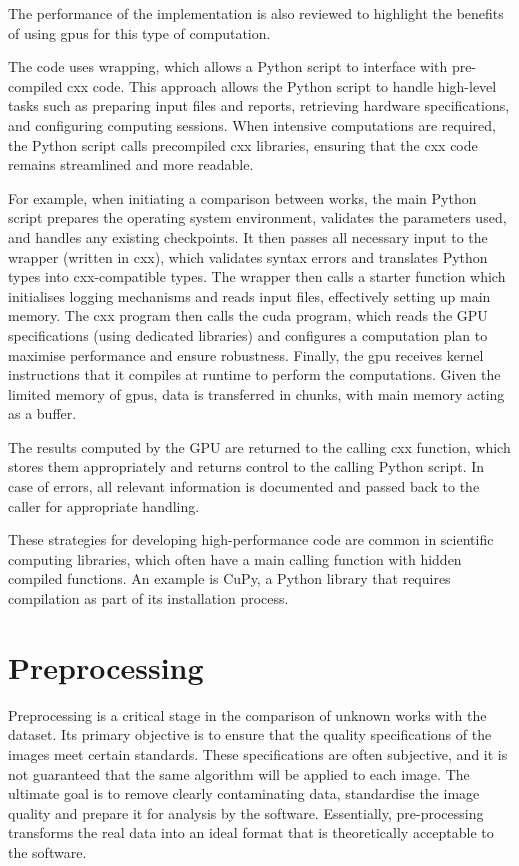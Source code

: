 \begin{toReview}
	\noindent The performance of the implementation is also reviewed to highlight the benefits of using \gls{gpu}s for this type of computation.

	\bigskip\noindent The code uses wrapping, which allows a \gls{Python} script to interface with pre-compiled \gls{cxx} code. This approach allows the \gls{Python} script to handle high-level tasks such as preparing input files and reports, retrieving hardware specifications, and configuring computing sessions. When intensive computations are required, the \gls{Python} script calls precompiled \gls{cxx} libraries, ensuring that the \gls{cxx} code remains streamlined and more readable.

	\noindent For example, when initiating a comparison between works, the main \gls{Python} script prepares the operating system environment, validates the parameters used, and handles any existing checkpoints. It then passes all necessary input to the wrapper (written in \gls{cxx}), which validates syntax errors and translates Python types into \gls{cxx}-compatible types. The wrapper then calls a starter function which initialises logging mechanisms and reads input files, effectively setting up main memory. The \gls{cxx} program then calls the \gls{cuda} program, which reads the GPU specifications (using dedicated libraries) and configures a computation plan to maximise performance and ensure robustness. Finally, the \gls{gpu} receives kernel instructions that it compiles at runtime to perform the computations. Given the limited memory of \gls{gpu}s, data is transferred in chunks, with main memory acting as a buffer.

	\noindent The results computed by the GPU are returned to the calling \gls{cxx} function, which stores them appropriately and returns control to the calling \gls{Python} script. In case of errors, all relevant information is documented and passed back to the caller for appropriate handling.

	\noindent These strategies for developing high-performance code are common in scientific computing libraries, which often have a main calling function with hidden compiled functions. An example is CuPy, a \gls{Python} library that requires compilation as part of its installation process.

	\section{Preprocessing}
	Preprocessing is a critical stage in the comparison of unknown works with the dataset. Its primary objective is to ensure that the quality specifications of the images meet certain standards. These specifications are often subjective, and it is not guaranteed that the same algorithm will be applied to each image. The ultimate goal is to remove clearly contaminating data, standardise the image quality and prepare it for analysis by the software. Essentially, pre-processing transforms the real data into an ideal format that is theoretically acceptable to the software.


\end{toReview}
